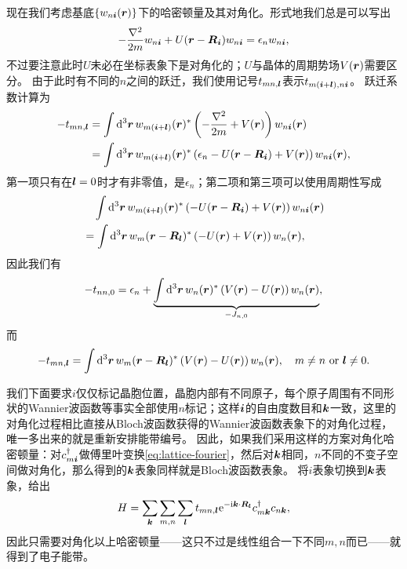现在我们考虑基底$\{w_{n \vb*{i}}(\vb*{r}) \}$下的哈密顿量及其对角化。形式地我们总是可以写出
\begin{equation}
    - \frac{\laplacian}{2m} w_{n \vb*{i}} + U(\vb*{r} - \vb*{R}_{\vb*{i}}) w_{n \vb*{i}} = \epsilon_{n} w_{n \vb*{i}},
\end{equation}
不过要注意此时$U$未必在坐标表象下是对角化的；$U$与晶体的周期势场$V(\vb*{r})$需要区分。
由于此时有不同的$n$之间的跃迁，我们使用记号$t_{mn, \vb*{l}}$表示$t_{m(\vb*{i}+\vb*{l}), n\vb*{i}}$。
跃迁系数计算为
\[
    \begin{aligned}
        - t_{mn, \vb*{l}} &= \int \dd[3]{\vb*{r}} w_{m(\vb*{i}+\vb*{l})}(\vb*{r})^* \left( - \frac{\laplacian}{2m} + V(\vb*{r}) \right) w_{n \vb*{i}}(\vb*{r}) \\
        &= \int \dd[3]{\vb*{r}} w_{m(\vb*{i}+\vb*{l})}(\vb*{r})^* \left( \epsilon_n - U(\vb*{r} - \vb*{R}_{\vb*{i}}) + V(\vb*{r}) \right) w_{n\vb*{i}}(\vb*{r}),
    \end{aligned}
\]
第一项只有在$\vb*{l}=0$时才有非零值，是$\epsilon_n$；第二项和第三项可以使用周期性写成
\[
    \begin{aligned}
        &\quad \int \dd[3]{\vb*{r}} w_{m (\vb*{i}+\vb*{l})}(\vb*{r})^* \left( - U(\vb*{r} - \vb*{R}_{\vb*{i}}) + V(\vb*{r}) \right) w_{n \vb*{i}}(\vb*{r}) \\
        &= \int \dd[3]{\vb*{r}} w_{m}(\vb*{r} - \vb*{R}_{\vb*{l}})^* \left( - U(\vb*{r}) + V(\vb*{r}) \right) w_{n}(\vb*{r}),
    \end{aligned}
\]
因此我们有
\begin{equation}
    - t_{nn, 0} = \epsilon_n + \underbrace{\int \dd[3]{\vb*{r}} w_{n}(\vb*{r})^* \left(V(\vb*{r}) - U(\vb*{r}) \right) w_{n}(\vb*{r})}_{- J_{n, 0}},
\end{equation}
而
\begin{equation}
    - t_{mn, \vb*{l}} = \int \dd[3]{\vb*{r}} w_{m}(\vb*{r} - \vb*{R}_{\vb*{l}})^* \left( V(\vb*{r}) - U(\vb*{r}) \right) w_{n}(\vb*{r}), \quad \text{$m \neq n$ or $\vb*{l} \neq 0$}.
    \label{eq:off-diagnoal-hopping}
\end{equation}

我们下面要求$i$仅仅标记晶胞位置，晶胞内部有不同原子，每个原子周围有不同形状的Wannier波函数等事实全部使用$n$标记；这样$\vb*{i}$的自由度数目和$\vb*{k}$一致，这里的对角化过程相比直接从Bloch波函数获得的Wannier波函数表象下的对角化过程，唯一多出来的就是重新安排能带编号。
因此，如果我们采用这样的方案对角化哈密顿量：对$c_{m\vb*{i}}^\dagger$做傅里叶变换\eqref{eq:lattice-fourier}，然后对$\vb*{k}$相同，$n$不同的不变子空间做对角化，那么得到的$\vb*{k}$表象同样就是Bloch波函数表象。
将$i$表象切换到$\vb*{k}$表象，给出
\begin{equation}
    H = \sum_{\vb*{k}} \sum_{m, n} \sum_{\vb*{l}} t_{mn, \vb*{l}} \mathrm{e}^{- \mathrm{i} \vb*{k} \cdot \vb*{R}_{\vb*{l}}} c^\dagger_{m \vb*{k}} c_{n \vb*{k}} ,
    \label{eq:k-points-with-hopping-bands}
\end{equation}
因此只需要对角化以上哈密顿量——这只不过是线性组合一下不同$m, n$而已——就得到了电子能带。

